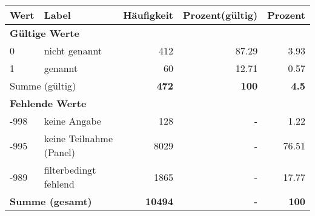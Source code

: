      \begin{longtable}{lXrrr}
     \toprule
     \textbf{Wert} & \textbf{Label} & \textbf{Häufigkeit} & \textbf{Prozent(gültig)} & \textbf{Prozent} \\
     \endhead
     \midrule
     \multicolumn{5}{l}{\textbf{Gültige Werte}}\\

     0 &
     \multicolumn{1}{X}{ nicht genannt   } &


       \num{412} &
       \num[round-mode=places,round-precision=2]{87,29} &
         \num[round-mode=places,round-precision=2]{3,93} \\

     1 &
     \multicolumn{1}{X}{ genannt   } &


       \num{60} &
       \num[round-mode=places,round-precision=2]{12,71} &
         \num[round-mode=places,round-precision=2]{0,57} \\
     \midrule
     \multicolumn{2}{l}{Summe (gültig)} &
       \textbf{\num{472}} &
     \textbf{100} &
       \textbf{\num[round-mode=places,round-precision=2]{4,5}} \\
     \multicolumn{5}{l}{\textbf{Fehlende Werte}}\\
       -998 &
       keine Angabe &
         \num{128} &
        - &
         \num[round-mode=places,round-precision=2]{1,22} \\
       -995 &
       keine Teilnahme (Panel) &
         \num{8029} &
        - &
         \num[round-mode=places,round-precision=2]{76,51} \\
       -989 &
       filterbedingt fehlend &
         \num{1865} &
        - &
         \num[round-mode=places,round-precision=2]{17,77} \\
     \midrule
     \multicolumn{2}{l}{\textbf{Summe (gesamt)}} &
          \textbf{\num{10494}} &
        \textbf{-} &
        \textbf{100} \\
     \bottomrule
     \end{longtable}
     
